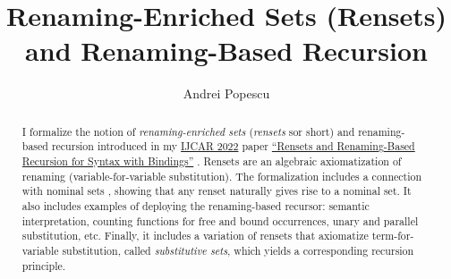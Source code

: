 \documentclass[11pt,a4paper]{article}
\begin{document}
\title{Renaming-Enriched Sets (Rensets) and Renaming-Based Recursion}
\author{Andrei Popescu}
\maketitle

\begin{abstract}
  I formalize the notion of \emph{renaming-enriched sets} (\emph{rensets} sor short) and renaming-based recursion introduced in my \href{https://link.springer.com/book/10.1007/978-3-031-10769-6}{IJCAR 2022} 
  paper \href{https://link.springer.com/chapter/10.1007/978-3-031-10769-6_36}{``Rensets and Renaming-Based Recursion for Syntax with Bindings''} \cite{DBLP:conf/cade/Popescu22}.  
  Rensets are an algebraic axiomatization of renaming (variable-for-variable substitution). 
  The formalization includes a connection with nominal sets \cite{DBLP:conf/lics/GabbayP99,pitts_2013}, showing that any renset naturally gives rise to a nominal set. 
   It also includes examples of deploying the renaming-based recursor:  semantic interpretation, counting functions for free and bound occurrences, unary and parallel substitution, etc. Finally, it includes a variation of rensets that axiomatize term-for-variable substitution, called \emph{substitutive sets}, which yields a  corresponding recursion principle. 
\end{abstract}

\tableofcontents





\end{document}
